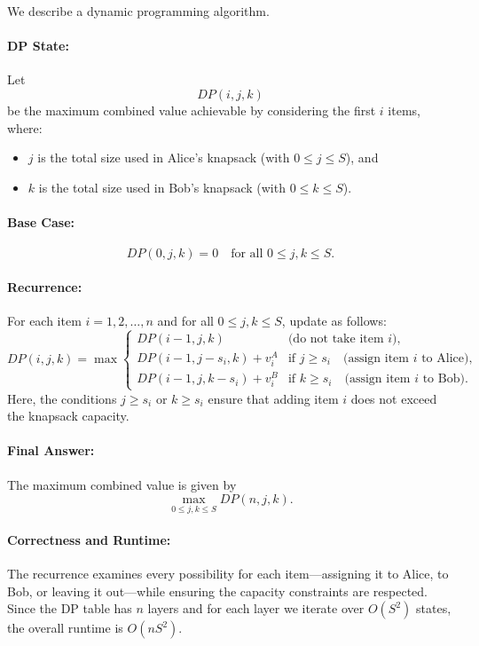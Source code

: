 \documentclass[11pt]{article}
\begin{document}
    We describe a dynamic programming algorithm.
    
    \paragraph{DP State:} Let 
    \[
    DP(i,j,k)
    \]
    be the maximum combined value achievable by considering the first \(i\) items, where:
    \begin{itemize}
        \item \(j\) is the total size used in Alice's knapsack (with \(0\le j\le S\)), and
        \item \(k\) is the total size used in Bob's knapsack (with \(0\le k\le S\)).
    \end{itemize}
    
    \paragraph{Base Case:}
    \[
    DP(0,j,k) = 0 \quad \text{for all } 0\le j,k \le S.
    \]
    
    \paragraph{Recurrence:} For each item \(i=1,2,\ldots,n\) and for all \(0\le j,k\le S\), update as follows:
    \[
    DP(i,j,k) = \max \begin{cases}
    DP(i-1, j, k) & \text{(do not take item } i\text{)}, \\[1mm]
    DP(i-1, j-s_i, k) + v_i^A & \text{if } j \ge s_i \quad \text{(assign item } i \text{ to Alice)}, \\[1mm]
    DP(i-1, j, k-s_i) + v_i^B & \text{if } k \ge s_i \quad \text{(assign item } i \text{ to Bob)}.
    \end{cases}
    \]
    Here, the conditions \(j\ge s_i\) or \(k\ge s_i\) ensure that adding item \(i\) does not exceed the knapsack capacity.
    
    \paragraph{Final Answer:}
    The maximum combined value is given by
    \[
    \max_{0\le j,k\le S} DP(n,j,k).
    \]
    
    \paragraph{Correctness and Runtime:}
    The recurrence examines every possibility for each item—assigning it to Alice, to Bob, or leaving it out—while ensuring the capacity constraints are respected. Since the DP table has \(n\) layers and for each layer we iterate over \(O(S^2)\) states, the overall runtime is \(O(nS^2)\).
    
\end{document}
